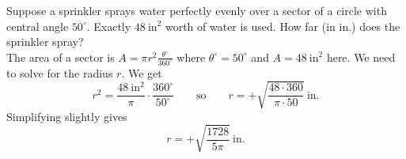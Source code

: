 Suppose a sprinkler sprays water perfectly evenly over a sector of a circle with central angle $50^{\circ}$. Exactly $48\ \text{in}^2$ worth of water is used. How far (in in.) does the sprinkler spray?
\[\]
The area of a sector is $A = \pi r^2 \frac{\theta^{\circ}}{360^{\circ}}$ where $\theta^{\circ} = 50^{\circ}$ and $A = 48\ \text{in}^2$ here. We need to solve for the radius $r$. We get
$$
  r^2 = \frac{48\ \text{in}^2}{\pi} \cdot \frac{360^{\circ}}{50^{\circ}} \qquad \text{so} \qquad r = +\sqrt{\frac{48 \cdot 360}{\pi \cdot 50}}\ \text{in}.
$$
Simplifying slightly gives
$$
  r = +\sqrt{\frac{1728}{5\pi}}\ \text{in}.
$$
